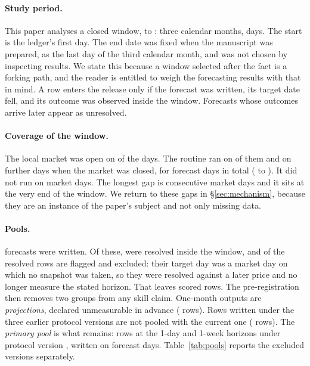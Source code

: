 \documentclass[11pt,a4paper]{article}
\begin{document}
\paragraph{Study period.} This paper analyses a closed window, \WindowStart{}
to \WindowEnd{}: three calendar months, \WindowCalDays{} days. The start is
the ledger's first day. The end date was fixed when the manuscript was
prepared, as the last day of the third calendar month, and was not chosen by
inspecting results. We state this because a window selected after the fact is
a forking path, and the reader is entitled to weigh the forecasting results
with that in mind. A row enters the release only if the forecast was written,
its target date fell, and its outcome was observed inside the window.
Forecasts whose outcomes arrive later appear as unresolved.

\paragraph{Coverage of the window.} The local market was open on \OpenDays{}
of the \WindowCalDays{} days. The routine ran on \OpenCovered{} of them and on
\ClosedCovered{} further days when the market was closed, for \NumDays{}
forecast days in total (\FirstDay{} to \LastDay). It did not run on
\OpenMissed{} market days. The longest gap is \MissRunMax{} consecutive market
days and it sits at the very end of the window. We return to these gaps in
\S\ref{sec:mechanism}, because they are an instance of the paper's subject and
not only missing data.

\paragraph{Pools.} \NumWritten{} forecasts were written. Of these,
\NumResolved{} were resolved inside the window, and \NumDirty{} of the
resolved rows are flagged and excluded: their target day was a market day on
which no snapshot was taken, so they were resolved against a later price and
no longer measure the stated horizon. That leaves \NumScoredAll{} scored rows.
The pre-registration then removes two groups from any skill claim. One-month
outputs are \emph{projections}, declared unmeasurable in advance
(\NumProjection{} rows). Rows written under the three earlier protocol
versions are not pooled with the current one (\NumEarlierProto{} rows). The
\emph{primary pool} is what remains: \PrimaryN{} rows at the 1-day and 1-week
horizons under protocol version \LatestProtocol{}, written on \PrimaryDays{}
forecast days. Table~\ref{tab:pools} reports the excluded versions separately.
\end{document}
